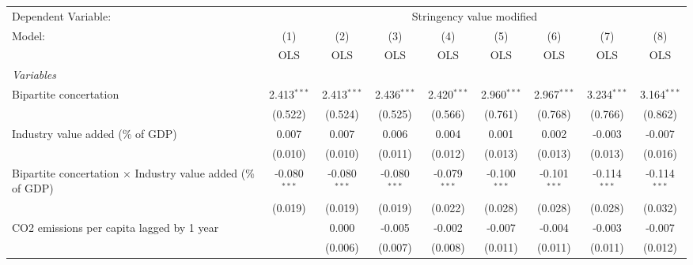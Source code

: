 
\begingroup
\centering
\begin{tabular}{lcccccccc}
   \toprule
   Dependent Variable: & \multicolumn{8}{c}{Stringency value modified}\\
   Model:                                                             & (1)            & (2)            & (3)            & (4)            & (5)            & (6)            & (7)            & (8)\\  
                                                                      &  OLS           & OLS            & OLS            & OLS            & OLS            & OLS            & OLS            & OLS\\  
   \midrule
   \emph{Variables}\\
   Bipartite concertation                                             & 2.413$^{***}$  & 2.413$^{***}$  & 2.436$^{***}$  & 2.420$^{***}$  & 2.960$^{***}$  & 2.967$^{***}$  & 3.234$^{***}$  & 3.164$^{***}$\\   
                                                                      & (0.522)        & (0.524)        & (0.525)        & (0.566)        & (0.761)        & (0.768)        & (0.766)        & (0.862)\\   
   Industry value added (\% of GDP)                                   & 0.007          & 0.007          & 0.006          & 0.004          & 0.001          & 0.002          & -0.003         & -0.007\\   
                                                                      & (0.010)        & (0.010)        & (0.011)        & (0.012)        & (0.013)        & (0.013)        & (0.013)        & (0.016)\\   
   Bipartite concertation $\times$ Industry value added (\% of GDP)   & -0.080$^{***}$ & -0.080$^{***}$ & -0.080$^{***}$ & -0.079$^{***}$ & -0.100$^{***}$ & -0.101$^{***}$ & -0.114$^{***}$ & -0.114$^{***}$\\   
                                                                      & (0.019)        & (0.019)        & (0.019)        & (0.022)        & (0.028)        & (0.028)        & (0.028)        & (0.032)\\   
   CO2 emissions per capita lagged by 1 year                          &                & 0.000          & -0.005         & -0.002         & -0.007         & -0.004         & -0.003         & -0.007\\   
                                                                      &                & (0.006)        & (0.007)        & (0.008)        & (0.011)        & (0.011)        & (0.011)        & (0.012)\\   

\end{tabular}

